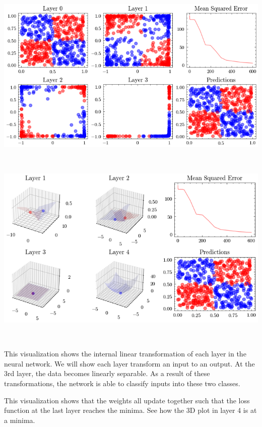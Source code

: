 \documentclass[openany]{book}
\begin{document}
    \begin{center}
    \includegraphics[width=\textwidth]{combined_files/combined_136_1.png}
    \end{center}
    { \hspace*{\fill} \\}
    
    \begin{center}
    \includegraphics[width=\textwidth]{combined_files/combined_136_2.png}
    \end{center}
    { \hspace*{\fill} \\}
    
    This visualization shows the internal linear transformation of each
layer in the neural network. We will show each layer transform an input
to an output. At the 3rd layer, the data becomes linearly separable. As
a result of these transformations, the network is able to classify
inputs into these two classes.
        
    This visualization shows that the weights all update together such that
the loss function at the last layer reaches the minima. See how the 3D
plot in layer 4 is at a minima.
        
\end{document}
